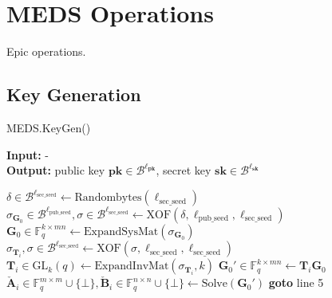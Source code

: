 \appendix
\chapter{MEDS Operations}
Epic operations.

\newpage
\section{Key Generation}
\begin{algorithm}[H]
\caption{MEDS.KeyGen()}\label{alg:medskeygen}
\hspace*{\algorithmicindent} \textbf{Input:} -\\
\hspace*{\algorithmicindent} \textbf{Output:} public key $\textbf{pk} \in \mathcal{B}^{\ell_\textbf{pk}}$, secret key $\textbf{sk} \in \mathcal{B}^{\ell_\textbf{sk}}$
\begin{algorithmic}[1]
\State $\delta \in \mathcal{B}^{\ell_\text{sec\_seed}} \gets \text{Randombytes}(\ell_\text{sec\_seed})$
\State $\sigma_{\textbf{G}_0} \in \mathcal{B}^{\ell_\text{pub\_seed}}, \sigma \in \mathcal{B}^{\ell_\text{sec\_seed}} \gets \text{XOF}(\delta, \ell_\text{pub\_seed}, \ell_\text{sec\_seed})$
\State $\textbf{G}_0 \in \mathds{F}_q^{k \times mn} \gets \text{ExpandSysMat}(\sigma_{\textbf{G}_0})$
    \State $\sigma_{\textbf{T}_i}, \sigma \in \mathcal{B}^{\ell_\text{sec\_seed}} \gets \text{XOF}(\sigma, \ell_\text{sec\_seed}, \ell_\text{sec\_seed})$
    \State $\textbf{T}_i \in \text{GL}_k(q) \gets \text{ExpandInvMat}(\sigma_{\textbf{T}_i}, k)$
    \State $\textbf{G}_0' \in \mathds{F}_q^{k \times mn} \gets \textbf{T}_i \textbf{G}_0$
    \State $\check{\textbf{A}}_i \in \mathds{F}_q^{m \times m} \cup \{\bot\}, \check{\textbf{B}}_i \in \mathds{F}_q^{n \times n} \cup \{\bot\} \gets \text{Solve}(\textbf{G}_0')$
        \State \textbf{goto} line 5

\end{algorithmic}
\end{algorithm}
